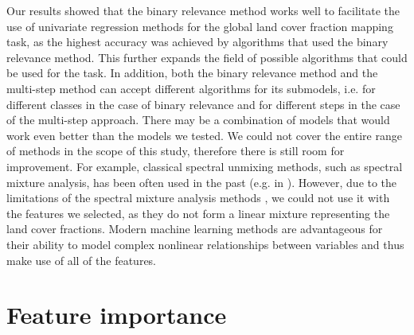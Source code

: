 \documentclass[review,authoryear,3p]{elsarticle}
\begin{document}
Our results showed that the binary relevance method works well to facilitate the use of univariate regression methods for the global land cover fraction mapping task, as the highest accuracy was achieved by algorithms that used the binary relevance method.
This further expands the field of possible algorithms that could be used for the task.
In addition, both the binary relevance method and the multi-step method can accept different algorithms for its submodels, i.e. for different classes in the case of binary relevance and for different steps in the case of the multi-step approach.
There may be a combination of models that would work even better than the models we tested.
We could not cover the entire range of methods in the scope of this study, therefore there is still room for improvement.
For example, classical spectral unmixing methods, such as spectral mixture analysis, has been often used in the past (e.g. in \citet{adams_classification_1995}).
However, due to the limitations of the spectral mixture analysis methods \citep{somers_endmember_2011}, we could not use it with the features we selected, as they do not form a linear mixture representing the land cover fractions.
Modern machine learning methods are advantageous for their ability to model complex nonlinear relationships between variables and thus make use of all of the features.

\section{Feature importance} \label{sec-varimp}

\end{document}
